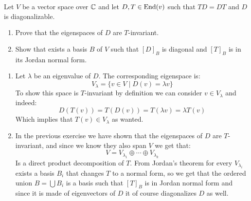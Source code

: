 \documentclass[11pt, a4paper]{article}
\begin{document}
\begin{exercise}
  Let $V$ be a vector space over $\mathbb{C}$ and let $D,T\in\operatorname{End}(v)$ such
  that $TD = DT$ and $D$ is diagonalizable.
  \begin{enumerate}
    \item[(1)] Prove that the eigenspaces of $D$ are $T$-invariant.
    \item[(2)] Show that exists a basis $B$ of $V$ such that $[D]_B$ is
      diagonal and $[T]_B$ is in its Jordan normal form.
  \end{enumerate}
\end{exercise}
\begin{solution} \phantom{}
\begin{enumerate}
\item[(1)]
  Let $\lambda$ be an eigenvalue of $D$. The corresponding eigenspace is:
  \[
    V_\lambda = \{v \in V \mid D(v) = \lambda v \}
  \]
  To show this space is $T$-invariant by definition we can consider 
  $v\in V_\lambda$ and indeed:
  \[
    D(T(v)) = T(D(v)) = T(\lambda v) = \lambda T(v)
  \]
  Which implies that $T(v)\in V_\lambda$ as wanted.
\item[(2)]
  In the previous exercise we have shown that the eigenspaces of $D$ are
  $T$-invariant, and since we know they also span $V$ we get that:
  \[
    V = V_{\lambda_1} \oplus \cdots \oplus V_{\lambda_k}
  \]
  Is a direct product decomposition of $T$. From Jordan's theorem
  for every $V_{\lambda_i}$ exists a basis $B_i$ that changes $T$ to a normal
  form, so we get that the ordered union $B = \bigcup B_i$ is a basis
  such that $[T]_B$ is in Jordan normal form and since it is made of
  eigenvectors of $D$ it of course diagonalizes $D$ as well.
\end{enumerate}
\end{solution}
\end{document}
